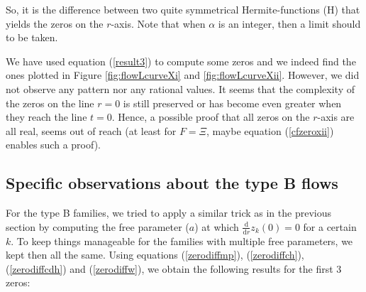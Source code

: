 \documentclass[a4paper,11pt,twoside]{amsart}
\begin{document}
So, it is the difference between two quite symmetrical Hermite-functions (H) that yields the zeros on the $r$-axis. Note that when $\alpha$ is an integer, then a limit should to be taken.

We have used equation (\ref{result3}) to compute some zeros and we indeed find the ones plotted in Figure \ref{fig:flowLcurveXi} and \ref{fig:flowLcurveXii}. However, we did not observe any pattern nor any rational values. It seems that the complexity of the zeros on the line $r=0$ is still preserved or has become even greater when they reach the line $t=0$. Hence, a possible proof that all zeros on the $r$-axis are all real, seems out of reach (at least for $F=\Xi$, maybe equation (\ref{cfzeroxii}) enables such a proof).   

\subsection{Specific observations about the type B flows}
For the type B families, we tried to apply a similar trick as in the previous section by computing the free parameter ($a$) at which $\frac{\mathrm{d}}{\mathrm{d} r} z_k(0) = 0$ for a certain $k$. To keep things manageable for the families with multiple free parameters, we kept then all the same. Using equations (\ref{zerodiffmp}), (\ref{zerodiffch}), (\ref{zerodiffcdh}) and (\ref{zerodiffw}), we obtain the following results for the first 3 zeros:
\end{document}
